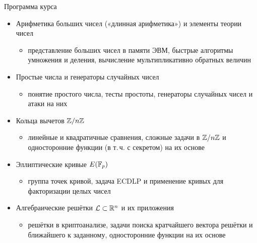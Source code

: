 \documentclass{ca-slides}
\begin{document}
\begin{canvasframe}{Программа курса}
  \small
  \begin{itemize}
    \item Арифметика больших чисел («длинная арифметика») и элементы теории чисел
    \begin{itemize}
      \item представление больших чисел в памяти ЭВМ, быстрые алгоритмы умножения и деления,
        вычисление мультипликативно обратных величин
    \end{itemize}
    \item Простые числа и генераторы случайных чисел
    \begin{itemize}
      \item понятие простого числа, тесты простоты, генераторы случайных чисел и атаки на них
    \end{itemize}
    \item Кольца вычетов $\mathbb{Z}/n\mathbb{Z}$
    \begin{itemize}
      \item линейные и квадратичные сравнения, сложные задачи в $\mathbb{Z}/n\mathbb{Z}$ и односторонние
        функции (в т.\,ч. с секретом) на их основе
    \end{itemize}
    \item Эллиптические кривые $E(\mathbb{F}_{p})$
    \begin{itemize}
      \item группа точек кривой, задача ECDLP и применение кривых для факторизации целых чисел
    \end{itemize}
    \item Алгебраические решётки $\mathcal{L} \subset \mathbb{R}^n$ и их приложения
    \begin{itemize}
      \item решётки в криптоанализе, задачи поиска кратчайшего вектора решётки и ближайшего
        к заданному, односторонние функции на их основе
    \end{itemize}
  \end{itemize}
\end{canvasframe}
\end{document}
